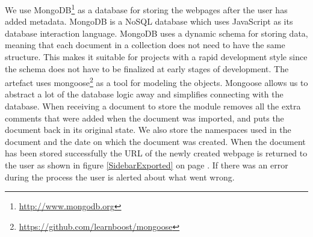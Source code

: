 We use MongoDB\footnote{\url{http://www.mongodb.org}} as a database for storing the webpages after the user has added metadata.
MongoDB is a NoSQL database which uses JavaScript as its database interaction language.
MongoDB uses a dynamic schema for storing data,
meaning that each document in a collection does not need to have the same structure.
This makes it suitable for projects with a rapid development style since the schema does not have to be
finalized at early stages of development.
The artefact uses mongoose\footnote{\url{https://github.com/learnboost/mongoose}} as a tool for modeling the objects.
Mongoose allows us to abstract a lot of the database logic away and simplifies connecting with the database.
When receiving a document to store the module removes all the extra comments that were added when the document was
imported, and puts the document back in its original state.
We also store the namespaces used in the document and the date on which the document was created.
When the document has been stored successfully the URL of the newly created webpage is returned to the user as shown in
figure \ref{SidebarExported} on page \pageref{SidebarExported}.
If there was an error during the process the user is alerted about what went wrong.
